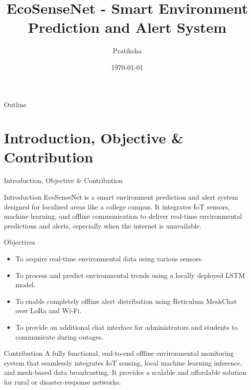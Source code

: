 \documentclass{beamer}
\title{EcoSenseNet - Smart Environment Prediction and Alert System}
\author{Pratiksha}
\institute{Indian Institute of Information Technology Senapati, Manipur}
\date{\today}
\begin{document}
\frame{\titlepage}

\begin{frame}{Outline}
  \tableofcontents
\end{frame}

\section{Introduction, Objective \& Contribution}
\begin{frame}{Introduction, Objective \& Contribution}
  \begin{block}{Introduction}
    EcoSenseNet is a smart environment prediction and alert system designed for localized areas like a college campus. It integrates IoT sensors, machine learning, and offline communication to deliver real-time environmental predictions and alerts, especially when the internet is unavailable.
  \end{block}
  \begin{block}{Objectives}
    \begin{itemize}
      \item To acquire real-time environmental data using various sensors.
      \item To process and predict environmental trends using a locally deployed LSTM model.
      \item To enable completely offline alert distribution using Reticulum MeshChat over LoRa and Wi-Fi.
      \item To provide an additional chat interface for administrators and students to communicate during outages.
    \end{itemize}
  \end{block}
  \begin{block}{Contribution}
    A fully functional, end-to-end offline environmental monitoring system that seamlessly integrates IoT sensing, local machine learning inference, and mesh-based data broadcasting. It provides a scalable and affordable solution for rural or disaster-response networks.
  \end{block}
\end{frame}
\end{document}
